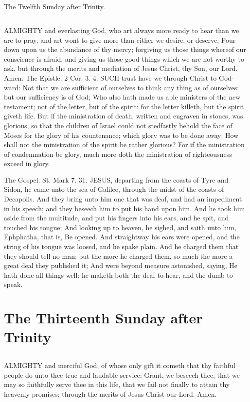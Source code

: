 The Twelfth Sunday after Trinity.
\subsection{}
ALMIGHTY and everlasting God, who art always more ready to hear than we are to pray, and art wont to give more than either we desire, or deserve; Pour down upon us the abundance of thy mercy; forgiving us those things whereof our conscience is afraid, and giving us those good things which we are not worthy to ask, but through the merits and mediation of Jesus Christ, thy Son, our Lord. Amen.
The Epistle. 2 Cor. 3. 4.
SUCH trust have we through Christ to God-ward: Not that we are sufficient of ourselves to think any thing as of ourselves; but our sufficiency is of God; Who also hath made us able ministers of the new testament; not of the letter, but of the spirit: for the letter killeth, but the spirit giveth life. But if the ministration of death, written and engraven in stones, was glorious, so that the children of Israel could not stedfastly behold the face of Moses for the glory of his countenance; which glory was to be done away: How shall not the ministration of the spirit be rather glorious? For if the ministration of condemnation be glory, much more doth the ministration of righteousness exceed in glory.


The Gospel. St. Mark 7. 31.
JESUS, departing from the coasts of Tyre and Sidon, he came unto the sea of Galilee, through the midst of the coasts of Decapolis. And they bring unto him one that was deaf, and had an impediment in his speech; and they beseech him to put his hand upon him. And he took him aside from the multitude, and put his fingers into his ears, and he spit, and touched his tongue; And looking up to heaven, he sighed, and saith unto him, Ephphatha, that is, Be opened. And straightway his ears were opened, and the string of his tongue was loosed, and he spake plain. And he charged them that they should tell no man: but the more he charged them, so much the more a great deal they published it; And were beyond measure astonished, saying, He hath done all things well: he maketh both the deaf to hear, and the dumb to speak.

\section{The Thirteenth Sunday after Trinity}
\subsection{}
ALMIGHTY and merciful God, of whose only gift it cometh that thy faithful people do unto thee true and laudable service; Grant, we beseech thee, that we may so faithfully serve thee in this life, that we fail not finally to attain thy heavenly promises; through the merits of Jesus Christ our Lord. Amen.


